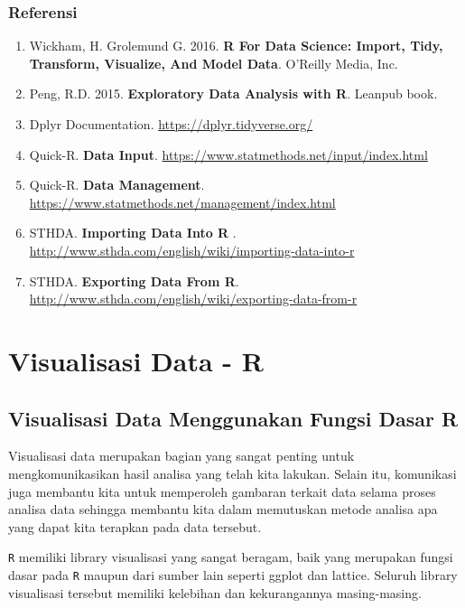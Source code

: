 \documentclass[]{book}
\providecommand{\tightlist}{%
  \setlength{\itemsep}{0pt}\setlength{\parskip}{0pt}}
\begin{document}
\section{Referensi}\label{referensi-2}

\begin{enumerate}
\def\labelenumi{\arabic{enumi}.}
\tightlist
\item
  Wickham, H. Grolemund G. 2016. \textbf{R For Data Science: Import,
  Tidy, Transform, Visualize, And Model Data}. O'Reilly Media, Inc.
\item
  Peng, R.D. 2015. \textbf{Exploratory Data Analysis with R}. Leanpub
  book.
\item
  Dplyr Documentation. \url{https://dplyr.tidyverse.org/}
\item
  Quick-R. \textbf{Data Input}.
  \url{https://www.statmethods.net/input/index.html}
\item
  Quick-R. \textbf{Data Management}.
  \url{https://www.statmethods.net/management/index.html}
\item
  STHDA. \textbf{Importing Data Into R }.
  \url{http://www.sthda.com/english/wiki/importing-data-into-r}
\item
  STHDA. \textbf{Exporting Data From R}.
  \url{http://www.sthda.com/english/wiki/exporting-data-from-r}
\end{enumerate}

\part*{Visualisasi Data - R}\label{part-visualisasi-data---r}

\chapter{Visualisasi Data Menggunakan Fungsi Dasar
R}\label{visualisasi-data-menggunakan-fungsi-dasar-r}

Visualisasi data merupakan bagian yang sangat penting untuk
mengkomunikasikan hasil analisa yang telah kita lakukan. Selain itu,
komunikasi juga membantu kita untuk memperoleh gambaran terkait data
selama proses analisa data sehingga membantu kita dalam memutuskan
metode analisa apa yang dapat kita terapkan pada data tersebut.

\texttt{R} memiliki library visualisasi yang sangat beragam, baik yang
merupakan fungsi dasar pada \texttt{R} maupun dari sumber lain seperti
ggplot dan lattice. Seluruh library visualisasi tersebut memiliki
kelebihan dan kekurangannya masing-masing.
\end{document}
